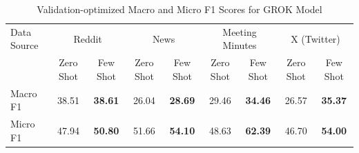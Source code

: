 \begin{table}[htbp]
\centering
\begin{tabular}{l *{8}{c}}
\toprule
Data Source & \multicolumn{2}{c}{Reddit} & \multicolumn{2}{c}{News} & \multicolumn{2}{c}{Meeting Minutes} & \multicolumn{2}{c}{X (Twitter)} \\
& Zero Shot & Few Shot & Zero Shot & Few Shot & Zero Shot & Few Shot & Zero Shot & Few Shot \\
\midrule
Macro F1 & 38.51 & \textbf{38.61} & 26.04 & \textbf{28.69} & 29.46 & \textbf{34.46} & 26.57 & \textbf{35.37} \\
Micro F1 & 47.94 & \textbf{50.80} & 51.66 & \textbf{54.10} & 48.63 & \textbf{62.39} & 46.70 & \textbf{54.00} \\
\bottomrule
\end{tabular}
\centering\caption{Validation-optimized Macro and Micro F1 Scores for GROK Model}
\label{tab:grok_macro_micro}
\end{table}